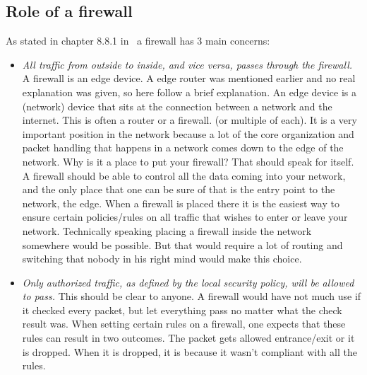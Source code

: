 \subsection{Role of a firewall}
As stated in chapter 8.8.1 in ~\textcite{NetworkingPearson}a firewall has 3 main concerns:
\begin{itemize}
\item\textit{ All traffic from outside to inside, and vice versa, passes through the firewall.} A firewall is an edge device. A edge router was mentioned earlier and no real explanation was given, so here follow a brief explanation. An edge device is a (network) device that sits at the connection between a network and the internet. This is often a router or a firewall. (or multiple of each). It is a very important position in the network because a lot of the core organization and packet handling that happens in a network comes down to the edge of the network. Why is it a place to put your firewall? That should speak for itself. A firewall should be able to control all the data coming into your network, and the only place that one can be sure of that is the entry point to the network, the edge. When a firewall is placed there it is the easiest way to ensure certain policies/rules on all traffic that wishes to enter or leave your network. Technically speaking placing a firewall inside the network somewhere would be possible. But that would require a lot of routing and switching that nobody in his right mind would make this choice.
\item \textit{Only authorized traffic, as defined by the local security policy, will be allowed to pass.} This should be clear to anyone. A firewall would have not much use if it checked every packet, but let everything pass no matter what the check result was. When setting certain rules on a firewall, one expects that these rules can result in two outcomes. The packet gets allowed entrance/exit or it is dropped. When it is dropped, it is because it wasn't compliant with all the rules.

\end{itemize}
